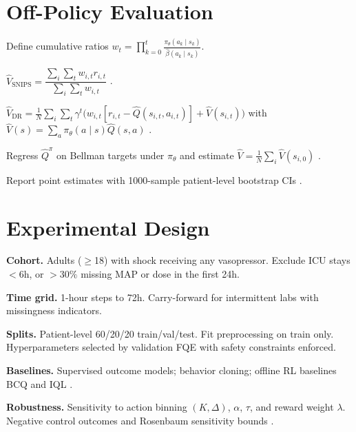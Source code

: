 \documentclass[11pt]{article}
\begin{document}
\section{Off-Policy Evaluation}\label{sec:ope}
Define cumulative ratios $w_t=\prod_{k=0}^t \frac{\pi_\theta(a_k\mid s_k)}{\hat\beta(a_k\mid s_k)}$.
\begin{description}[leftmargin=*,style=nextline]
  \item[SNIPS] $\hat V_{\text{SNIPS}}= \dfrac{\sum_i\sum_t w_{i,t} r_{i,t}}{\sum_i\sum_t w_{i,t}}$ \citep{swaminathan2015crm}.
  \item[DR] $\hat V_{\text{DR}}= \frac{1}{N}\sum_i\sum_t \gamma^t\big(w_{i,t}[r_{i,t}-\hat Q(s_{i,t},a_{i,t})]+\hat V(s_{i,t})\big)$ with $\hat V(s)=\sum_a\pi_\theta(a\mid s)\hat Q(s,a)$ \citep{jiang2016doubly}.
  \item[FQE] Regress $\hat Q^{\pi}$ on Bellman targets under $\pi_\theta$ and estimate $\hat V=\tfrac{1}{N}\sum_i\hat V(s_{i,0})$ \citep{le2019fqe}.
\end{description}
Report point estimates with 1000-sample patient-level bootstrap CIs \citep{efron1994bootstrap}.

\section{Experimental Design}
\textbf{Cohort.} Adults ($\geq$18) with shock receiving any vasopressor. Exclude ICU stays $<6$h, or $>30\%$ missing MAP or dose in the first 24h.

\textbf{Time grid.} 1-hour steps to 72h. Carry-forward for intermittent labs with missingness indicators.

\textbf{Splits.} Patient-level 60/20/20 train/val/test. Fit preprocessing on train only. Hyperparameters selected by validation FQE with safety constraints enforced.

\textbf{Baselines.} Supervised outcome models; behavior cloning; offline RL baselines BCQ and IQL \citep{fujimoto2019bcq,kostrikov2022iql}.

\textbf{Robustness.} Sensitivity to action binning $(K,\Delta)$, $\alpha$, $\tau$, and reward weight $\lambda$. Negative control outcomes and Rosenbaum sensitivity bounds \citep{rosenbaum2002observational}.
\end{document}
